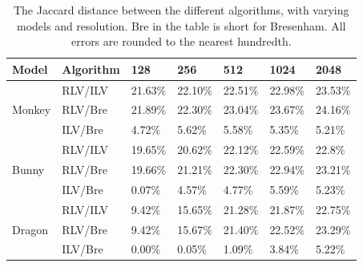 \begin{table}[h]
  \centering
\begin{tabular}{l|l|lllll}
  Model & Algorithm & 128 & 256 & 512 & 1024 & 2048 \\
  \hline
         & RLV/ILV & 21.63\% & 22.10\% & 22.51\% & 22.98\% & 23.53\% \\
  Monkey & RLV/Bre & 21.89\% & 22.30\% & 23.04\% & 23.67\% & 24.16\% \\
         & ILV/Bre & 4.72\% & 5.62\% & 5.58\% & 5.35\% & 5.21\% \\
  \hline
         & RLV/ILV & 19.65\% & 20.62\% & 22.12\% & 22.59\% & 22.8\% \\
  Bunny  & RLV/Bre & 19.66\% & 21.21\% & 22.30\% & 22.94\% & 23.21\% \\
         & ILV/Bre & 0.07\% & 4.57\% & 4.77\% & 5.59\% & 5.23\% \\
  \hline
         & RLV/ILV & 9.42\% & 15.65\% & 21.28\% & 21.87\% & 22.75\% \\
  Dragon & RLV/Bre & 9.42\% & 15.67\% & 21.40\% & 22.52\% & 23.29\% \\
         & ILV/Bre & 0.00\% & 0.05\% & 1.09\% & 3.84\% & 5.22\% \\
\end{tabular}
\caption{The Jaccard distance between the different algorithms, with varying models and resolution. Bre in the table is short for Bresenham. All errors are rounded to the nearest hundredth.}\label{tab:error-data}
\end{table}

